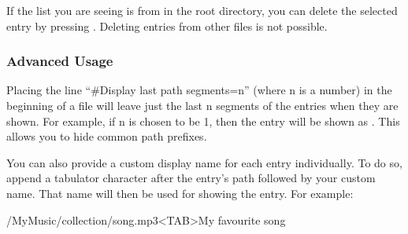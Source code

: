 If the list you are seeing is from  in the root
directory, you can delete the selected entry by pressing \ActionStdMenu.
Deleting entries from other  files is not possible.


\subsubsection{Advanced Usage}

Placing the line ``\#Display last path segments=n'' (where n is a number) in
the beginning of a  file will leave just the last n segments of
the entries when they are shown. For example, if n is chosen to be 1, then
the entry  will be shown as
. This allows you to hide common path prefixes.

You can also provide a custom display name for each entry individually. To
do so, append a tabulator character after the entry's path followed by your
custom name. That name will then be used for showing the entry. For example:
\begin{example}
    /MyMusic/collection/song.mp3<TAB>My favourite song
\end{example}
